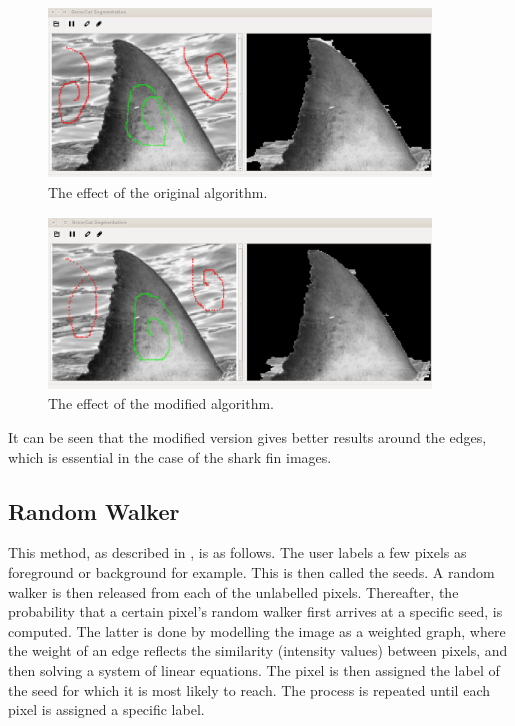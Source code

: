 \documentclass[a4paper,10pt]{article}
\begin{document}
\begin{figure}[H]
 \centering
 \includegraphics[width=4in, height=1.8in]{haaio}
 \caption{The effect of the original algorithm.}
 \label{fin1}
\end{figure}

\begin{figure}[H]
 \centering
 \includegraphics[width=4in, height=1.8in]{haaim}
 \caption{The effect of the modified algorithm.}
 \label{fin2}
\end{figure}

\noindent It can be seen that the modified version gives better results around
the edges, which is essential in the case of the shark fin images. \\  


\subsection{Random Walker}
This method, as
described in \cite{rw}, is as follows.  The user labels a few
pixels as foreground or background for example.  This is then called the seeds. 
A random walker is then released from each of the unlabelled pixels. 
Thereafter, the probability that a certain pixel's random walker first arrives
at a specific seed, is computed.  The latter is done by modelling the image as a weighted graph, where
the weight of an edge reflects the similarity (intensity values) between pixels,
and then solving a system of linear equations.  The pixel is then assigned the
label
of the seed for which it is most likely to reach.  The process is repeated until
each pixel is assigned a specific label.
\end{document}
